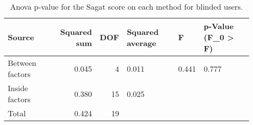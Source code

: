 
\begin{table}[!htb]
\centering
\caption{Anova p-value for the Sagat score on each method for blinded users.}
\label{tab:anova_sagat_avg}
\begin{tabular}{lrrlll}
\toprule
         Source &  Squared sum &  DOF & Squared average &     F & p-Value (F\_0 > F) \\
\midrule
Between factors &        0.045 &    4 &           0.011 & 0.441 &             0.777 \\
 Inside factors &        0.380 &   15 &           0.025 &       &                   \\
          Total &        0.424 &   19 &                 &       &                   \\
\bottomrule
\end{tabular}
\end{table}

